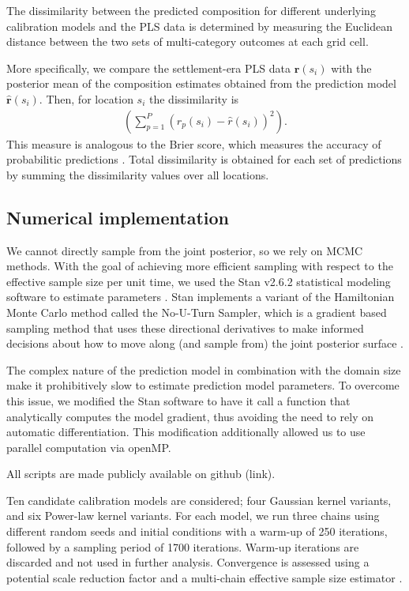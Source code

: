 \documentclass[12pt]{article}
\begin{document}
The dissimilarity between the predicted composition for different
underlying calibration models and the PLS data is determined by
measuring the Euclidean distance between the two sets of
multi-category outcomes at each grid cell.

More specifically, we compare the settlement-era PLS data
$\bm{r}(s_i)$ with the posterior mean of the composition estimates
obtained from the prediction model $\hat{\bm{r}}(s_i)$. Then, for
location $s_i$ the dissimilarity is
\begin{align*}
\left( \sum_{p=1}^{P} (r_p(s_i) - \hat{r}(s_i))^2 \right).
\end{align*}
This measure is analogous to the Brier score, which measures the
accuracy of probabilitic predictions
\citep{gneiting2007strictly}. Total dissimilarity is obtained for each
set of predictions by summing the dissimilarity values over all
locations.

\subsection{Numerical implementation}
\label{sec:imp}

We cannot directly sample from the joint posterior, so we rely on MCMC
methods. With the goal of achieving more efficient sampling with
respect to the effective sample size per unit time, we used the Stan
v2.6.2 statistical modeling software to estimate parameters
\citep{stan-software:2014}. Stan implements a variant of the
Hamiltonian Monte Carlo method called the No-U-Turn Sampler, which is
a gradient based sampling method that uses these directional
derivatives to make informed decisions about how to move along (and
sample from) the joint posterior surface \citep{hoffman2011nuts}.

The complex nature of the prediction model in combination with the
domain size make it prohibitively slow to estimate prediction model
parameters. To overcome this issue, we modified the Stan software to
have it call a function that analytically computes the model gradient,
thus avoiding the need to rely on automatic differentiation. This
modification additionally allowed us to use parallel computation via
openMP.

All scripts are made publicly available on github (link).

Ten candidate calibration models are considered; four Gaussian kernel
variants, and six Power-law kernel variants. For each model, we run
three chains using different random seeds and initial conditions with
a warm-up of 250 iterations, followed by a sampling period of 1700
iterations. Warm-up iterations are discarded and not used in further
analysis. Convergence is assessed using a potential scale reduction
factor and a multi-chain effective sample size estimator
\citep{gelman2014bayesian}.
\end{document}
